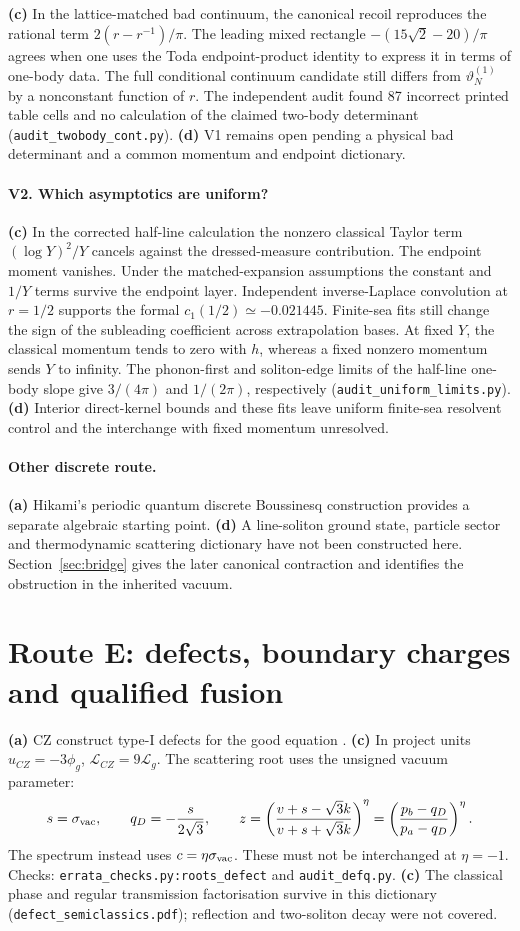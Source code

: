 \documentclass[11pt,a4paper]{article}
\newcommand{\La}{\textsf{\textbf{(a)}}\xspace}
\newcommand{\Lc}{\textsf{\textbf{(c)}}\xspace}
\newcommand{\Ld}{\textsf{\textbf{(d)}}\xspace}
\newcommand{\file}[1]{\nolinkurl{#1}}
\theoremstyle{remark}\newtheorem{remark}[proposition]{Remark}
\begin{document}
\Lc In the lattice-matched bad continuum, the canonical recoil reproduces
the rational term $2(r-r^{-1})/\pi$. The leading mixed rectangle
$-(15\sqrt{2}-20)/\pi$ agrees when one uses the Toda endpoint-product
identity to express it in terms of one-body data. The full conditional
continuum candidate still differs from $\vartheta_N^{(1)}$ by a nonconstant
function of $r$. The independent audit found 87 incorrect printed table
cells and no calculation of the claimed two-body determinant
(\file{audit_twobody_cont.py}). \Ld V1 remains open pending a physical
bad determinant and a common momentum and endpoint dictionary.

\paragraph{V2. Which asymptotics are uniform?}
\Lc In the corrected half-line calculation the nonzero classical Taylor
term $(\log Y)^2/Y$ cancels against the dressed-measure contribution.
The endpoint moment vanishes. Under the matched-expansion assumptions
the constant and $1/Y$ terms survive the endpoint layer. Independent
inverse-Laplace convolution at $r=1/2$ supports the formal
$c_1(1/2)\simeq-0.021445$. Finite-sea fits still change the sign of
the subleading coefficient across extrapolation bases. At fixed $Y$,
the classical momentum tends to zero with $h$, whereas a fixed nonzero
momentum sends $Y$ to infinity. The phonon-first and soliton-edge limits
of the half-line one-body slope give $3/(4\pi)$ and $1/(2\pi)$,
respectively (\file{audit_uniform_limits.py}). \Ld Interior direct-kernel
bounds and these fits leave uniform finite-sea resolvent control and the
interchange with fixed momentum unresolved.

\paragraph{Other discrete route.}
\La Hikami's periodic quantum discrete Boussinesq construction \cite{Hikami}
provides a separate algebraic starting point. \Ld A line-soliton ground state,
particle sector and thermodynamic scattering dictionary have not been
constructed here. Section~\ref{sec:bridge} gives the later canonical
contraction and identifies the obstruction in the inherited vacuum.

\section{Route E: defects, boundary charges and qualified fusion}
\La CZ construct type-I defects for the good equation \cite{CZ}.
\Lc In project units $u_{CZ}=-3\phi_g$, $\mathcal L_{CZ}=9\mathcal L_g$.
The scattering root uses the unsigned vacuum parameter:
\[
 s=\sigma_{\rm vac},\qquad q_D=-\frac{s}{2\sqrt3},\qquad
 z=\left(\frac{v+s-\sqrt3k}{v+s+\sqrt3k}\right)^\eta
  =\left(\frac{p_b-q_D}{p_a-q_D}\right)^\eta.
\]
The spectrum instead uses $c=\eta\sigma_{\rm vac}$. These must not be
interchanged at $\eta=-1$. Checks: \file{errata_checks.py:roots_defect} and
\file{audit_defq.py}. \Lc The classical phase and regular transmission
factorisation survive in this dictionary (\file{defect_semiclassics.pdf});
reflection and two-soliton decay were not covered.
\end{document}
